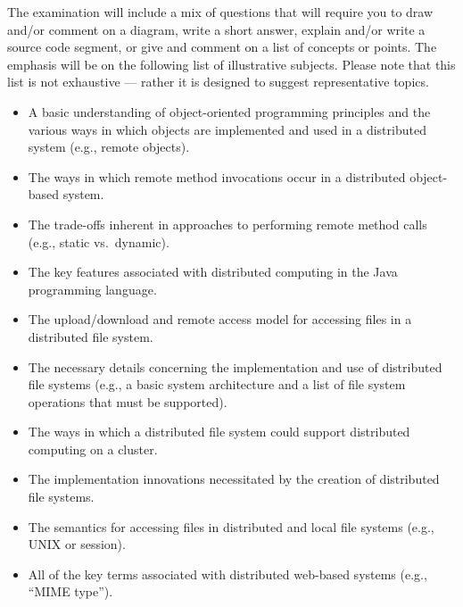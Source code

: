 \vspace*{-.05in}

\noindent The examination will include a mix of questions that will require you to draw and/or comment on a diagram,
write a short answer, explain and/or write a source code segment, or give and comment on a list of concepts or points.
The emphasis will be on the following list of illustrative subjects. Please note that this list is not exhaustive ---
rather it is designed to suggest representative topics.

\vspace*{-.05in}
\begin{itemize}

  \itemsep 0in

  \item A basic understanding of object-oriented programming principles and the various ways in which objects are
    implemented and used in a distributed system (e.g., remote objects).

  \item The ways in which remote method invocations occur in a distributed object-based system.

  \item The trade-offs inherent in approaches to performing remote method calls (e.g., static \mbox{vs.\ dynamic}).

  \item The key features associated with distributed computing in the Java programming language.

  \item The upload/download and remote access model for accessing files in a distributed file system.

  \item The necessary details concerning the implementation and use of distributed file systems (e.g., a basic system
    architecture and a list of file system operations that must be supported).

  \item The ways in which a distributed file system could support distributed computing on a cluster.

  \item The implementation innovations necessitated by the creation of distributed file systems.

  \item The semantics for accessing files in distributed and local file systems (e.g., UNIX or session).

  \item All of the key terms associated with distributed web-based systems (e.g., ``MIME type'').


\end{itemize}

